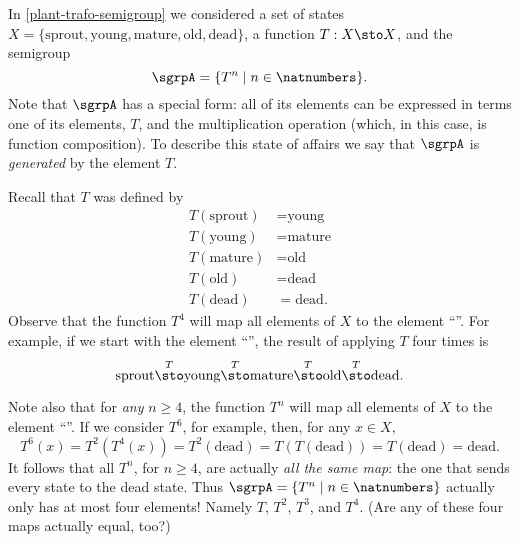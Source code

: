 

\section{}




In \cref{plant-trafo-semigroup} we considered a set of states $X = \{ \text{sprout}, \text{young}, \text{mature}, \text{old}, \text{dead} \}$, a function $T: X \sto X$, and the semigroup
\begin{equation}
\sgrpA = \{ T^n \mid n \in \natnumbers \}.
\end{equation}
Note that $\sgrpA$ has a special form: all of its elements can be expressed in terms one of its elements, $T$, and the multiplication operation (which, in this case, is function composition). To describe this state of affairs we say that $\sgrpA$ is \emph{generated} by the element $T$.


Recall that $T$ was defined by
\begin{align*}
T(\text{sprout}) &=  \text{young} \\
T(\text{young}) &=  \text{mature} \\
T(\text{mature}) &=  \text{old} \\
T( \text{old}) &= \text{dead} \\
T (\text{dead}) &= \text{dead}.
\end{align*}
Observe that the function $T^4$ will map all elements of $X$ to the element ``''. For example, if we start with the element ``'', the result of applying $T$ four times is
$$
\text{sprout} \overset{T}{\sto} \text{young} \overset{T}{\sto} \text{mature} \overset{T}{\sto} \text{old} \overset{T}{\sto} \text{dead}.
$$

Note also that for \emph{any} $n \geq 4$, the function $T^n$ will map all elements of $X$ to the element ``''.
If we consider $T^6$, for example, then, for any $x \in X$,
$$
T^6(x) = T^2(T^4(x)) = T^2(\text{dead}) = T(T(\text{dead})) = T(\text{dead}) = \text{dead}.
$$
It follows that all $T^n$, for $n \geq 4$, are actually \emph{all the same map}: the one that sends every state to the dead state. Thus $\sgrpA = \{ T^n \mid n \in \natnumbers \}$ actually only has at most four elements! Namely $T$, $T^2$, $T^3$, and $T^4$. (Are any of these four maps actually equal, too?)

